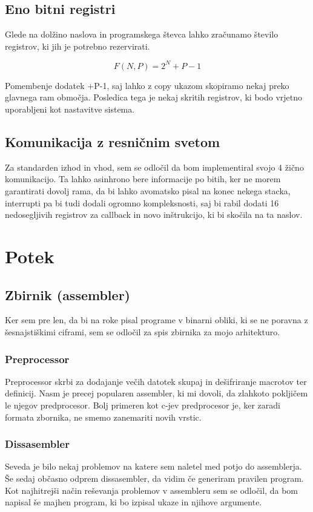 \documentclass[12pt]{article}
\begin{document}
\subsection{Eno bitni registri}
Glede na dolžino naslova in programskega števca lahko zračunamo število registrov, ki jih je potrebno rezervirati.
\begin{figure}[h]
\begin{displaymath}
  F(N,P)=2^{N}+P-1
\end{displaymath}
\end{figure}
Pomembenje dodatek +P-1, saj lahko z copy ukazom skopiramo nekaj preko glavnega ram območja.
Posledica tega je nekaj skritih registrov, ki bodo vrjetno uporabljeni kot nastavitve sistema.

\subsection{Komunikacija z resničnim svetom}
Za standarden izhod in vhod, sem se odločil da bom implementiral svojo 4 žično komunikacijo.
Ta lahko asinhrono bere informacije po bitih, ker ne morem garantirati dovolj rama, da bi lahko avomatsko pisal na konec nekega stacka, interrupti pa bi tudi dodali ogromno kompleksnosti, saj bi rabil dodati 16 nedosegljivih registrov za callback in novo inštrukcijo, ki bi skočila na ta naslov.

\section{Potek} %
\subsection{Zbirnik (assembler)}
Ker sem pre len, da bi na roke pisal programe v binarni obliki, ki se ne poravna z šesnajstiškimi ciframi, sem se odločil za spis zbirnika za mojo arhitekturo.
\subsubsection{Preprocessor}
Preprocessor skrbi za dodajanje večih datotek skupaj in dešifriranje macrotov ter definicij.
Nasm je precej popularen assembler, ki mi dovoli, da zlahkoto pokljičem le njegov predprocesor.
Bolj primeren kot c-jev predprocesor je, ker zaradi formata zbornika, ne smemo zanemariti novih vrstic.
\subsubsection{Dissasembler}
Seveda je bilo nekaj problemov na katere sem naletel med potjo do assemblerja.
Še sedaj občasno odprem dissasembler, da vidim če generiram pravilen program.
Kot najhitrejši način reševanja problemov v assembleru sem se odločil, da bom napisal še majhen program, ki bo izpisal ukaze in njihove argumente.
\end{document}
